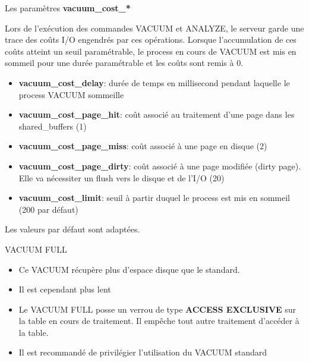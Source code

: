 
\begin{frame}{Les paramètres \textbf{vacuum\_cost\_*}}

   Lors de l'exécution des commandes VACUUM et ANALYZE, le serveur garde une trace des coûts I/O engendrés par ces opérations. Lorsque l'accumulation de ces coûts atteint un seuil paramétrable, le process en cours de VACUUM est mis en sommeil pour une durée paramétrable et les coûts sont remis à 0.
   \begin{itemize}
      \item \textbf{vacuum\_cost\_delay}: durée de temps en millisecond pendant laquelle le process VACUUM sommeille
      \item \textbf{vacuum\_cost\_page\_hit}: coût associé au traitement d'une page dans les shared\_buffers (1)
      \item \textbf{vacuum\_cost\_page\_miss}: coût associé à une page en disque (2)
      \item \textbf{vacuum\_cost\_page\_dirty}: coût associé à une page modifiée (dirty page). Elle va nécessiter un flush vers le disque et de l'I/O (20)
      \item \textbf{vacuum\_cost\_limit}: seuil à partir duquel le process est mis en sommeil (200 par défaut)
   \end{itemize}

   Les valeurs par défaut sont adaptées.

\begin{toile}
\end{toile}
   
\end{frame}


\begin{frame}{VACUUM FULL}

   \begin{itemize}
      \item Ce VACUUM récupère plus d'espace disque que le standard.
      \item Il est cependant plus lent
      \item Le VACUUM FULL posse un verrou de type \textbf{ACCESS EXCLUSIVE} sur la table en cours de traitement. Il empêche tout autre traitement d'accéder à la table.
      \item Il est recommandé de privilégier l'utilisation du VACUUM standard
   \end{itemize}

\end{frame}

